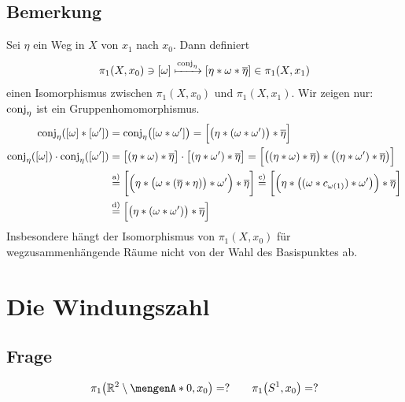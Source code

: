 \subsection[Bemerkung: Isomorphie zwischen Fundamentalgruppen]{Bemerkung} %
\label{sub:911}
Sei $\eta$ ein Weg in $X$ von $x_1$ nach $x_0$. Dann definiert
\[
	\pi_1(X,x_0) \ni [\omega] \xmapsto{\conj_\eta} \benbrace*{\eta * \omega * \overline{\eta}}  \in \pi_1(X,x_1)
\]
einen Isomorphismus zwischen $\pi_1(X,x_0)$ und $\pi_1(X,x_1)$. Wir zeigen nur: $\conj_\eta$ ist ein Gruppenhomomorphismus.
\begin{align*}
	\conj_\eta \enbrace*{ \benbrace*{\omega} * \benbrace*{\omega'}} &= \conj_\eta \enbrace[\big]{ \benbrace*{\omega * \omega'}} = \benbrace[\Big]{ \enbrace[\big]{\eta * (\omega * \omega')} * \overline{\eta}  }  \\
	\conj_\eta \enbrace*{[\omega]} \cdot \conj_\eta \enbrace*{[\omega']} &= \benbrace[\big]{(\eta * \omega) * \overline{\eta} } \cdot  \benbrace[\big]{(\eta * \omega') * \overline{\eta}} = \benbrace[\Big]{ \enbrace[\big]{ \enbrace*{\eta * \omega}* \overline{\eta}  } * \enbrace[\big]{\enbrace*{\eta * \omega'} * \overline{\eta}  }  } \\
	&\stackrel{\text{a)}}{=} \benbrace[\bigg]{ \enbrace[\Big]{\eta * \enbrace[\big]{\omega * \enbrace*{\overline{\eta} * \eta } }* \omega' } * \overline{\eta}  } 
	\stackrel{\text{c)}}{=} \benbrace[\bigg]{\enbrace[\Big]{ \eta * \enbrace[\big]{\enbrace{\omega * c_{\omega(1)}} * \omega' } } * \overline{\eta}} \\
	&\stackrel{\text{d)}}{=}
	\benbrace[\Big]{\enbrace[\big]{\eta * \enbrace*{\omega * \omega'} } * \overline{\eta}  } 
\end{align*}
Insbesondere hängt der Isomorphismus von $\pi_1(X,x_0)$ für wegzusammenhängende Räume nicht von der Wahl des Basispunktes ab.
\newpage

\section{Die Windungszahl} %
\label{sec:10}
\subsection[Frage nach der Gruppenstruktur von Fundamentalgruppen]{Frage} %
\label{sub:101}
\[
	\pi_1 \enbrace*{\mathds{R}^2 \setminus \set{0}, x_0 } = ? \qquad \pi_1 \enbrace*{S^1, x_0} = ?  
\]

